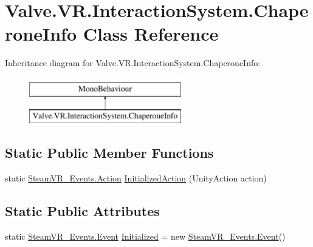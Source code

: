 \hypertarget{class_valve_1_1_v_r_1_1_interaction_system_1_1_chaperone_info}{}\section{Valve.\+V\+R.\+Interaction\+System.\+Chaperone\+Info Class Reference}
\label{class_valve_1_1_v_r_1_1_interaction_system_1_1_chaperone_info}
Inheritance diagram for Valve.\+V\+R.\+Interaction\+System.\+Chaperone\+Info\+:\begin{figure}[H]
\begin{center}
\leavevmode
\includegraphics[height=2.000000cm]{class_valve_1_1_v_r_1_1_interaction_system_1_1_chaperone_info}
\end{center}
\end{figure}
\subsection*{Static Public Member Functions}
\begin{DoxyCompactItemize}
\item 
static \mbox{\hyperlink{class_valve_1_1_v_r_1_1_steam_v_r___events_1_1_action}{Steam\+V\+R\+\_\+\+Events.\+Action}} \mbox{\hyperlink{class_valve_1_1_v_r_1_1_interaction_system_1_1_chaperone_info_a67077285a9b36c0dd9c3ea1e8357bd24}{Initialized\+Action}} (Unity\+Action action)
\end{DoxyCompactItemize}
\subsection*{Static Public Attributes}
\begin{DoxyCompactItemize}
\item 
static \mbox{\hyperlink{class_valve_1_1_v_r_1_1_steam_v_r___events_1_1_event}{Steam\+V\+R\+\_\+\+Events.\+Event}} \mbox{\hyperlink{class_valve_1_1_v_r_1_1_interaction_system_1_1_chaperone_info_a91c71f8bac1161a17b2ab6f9c68333b0}{Initialized}} = new \mbox{\hyperlink{class_valve_1_1_v_r_1_1_steam_v_r___events_1_1_event}{Steam\+V\+R\+\_\+\+Events.\+Event}}()
\end{DoxyCompactItemize}
